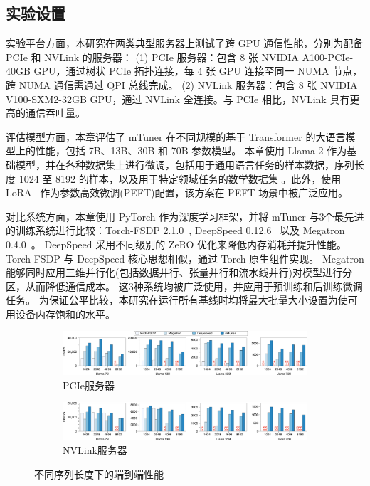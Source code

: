 \subsection{实验设置}
实验平台方面，本研究在两类典型服务器上测试了跨 GPU 通信性能，分别为配备 PCIe 和 NVLink 的服务器：
(1) PCIe 服务器：包含 8 张 NVIDIA A100-PCIe-40GB GPU，通过树状 PCIe 拓扑连接，每 4 张 GPU 连接至同一 NUMA 节点，跨 NUMA 通信需通过 QPI 总线完成。
(2) NVLink 服务器：包含 8 张 NVIDIA V100-SXM2-32GB GPU，通过 NVLink 全连接。与 PCIe 相比，NVLink 具有更高的通信吞吐量。

评估模型方面，本章评估了 mTuner 在不同规模的基于 Transformer 的大语言模型上的性能，包括 7B、13B、30B 和 70B 参数模型。
本章使用 Llama-2 \cite {llama2} 作为基础模型，并在各种数据集上进行微调，包括用于通用语言任务的样本数据，序列长度 1024 至 8192 的样本，以及用于特定领域任务的数学数据集 \cite{math-datatset}。此外，使用 LoRA~\cite {peft-adapter-lora} 作为参数高效微调(PEFT)配置，该方案在 PEFT 场景中被广泛应用\cite {huggingface-peft}。

对比系统方面，本章使用 PyTorch 作为深度学习框架，并将 mTuner 与3个最先进的训练系统进行比较：Torch-FSDP 2.1.0~\cite{TorchFSDP}, DeepSpeed 0.12.6~\cite{rasley2020DeepSpeed} 以及 Megatron 0.4.0~\cite{krothikanti2022megatronv3}。
DeepSpeed 采用不同级别的 ZeRO 优化来降低内存消耗并提升性能。
Torch-FSDP 与 DeepSpeed 核心思想相似，通过 Torch 原生组件实现。
Megatron 能够同时应用三维并行化(包括数据并行、张量并行和流水线并行)对模型进行分区，从而降低通信成本。
这3种系统均被广泛使用，并应用于预训练和后训练微调任务。
为保证公平比较，本研究在运行所有基线时均将最大批量大小设置为使可用设备内存饱和的水平。

\begin{figure}[t]
     \centering
     \begin{subfigure}[b]{\textwidth}
         \centering
         \includegraphics[width=\textwidth]{figures/mtuner/exp-img/overall-a100-crop.pdf}
         \caption{PCIe服务器}
         \label{fig:overall-a100}
     \end{subfigure}
     \vfill
     \begin{subfigure}[b]{\textwidth}
         \centering
         \includegraphics[width=\textwidth]{figures/mtuner/exp-img/overall-all-seq-v100-nvlink-crop.pdf}
         \caption{NVLink服务器}
         \label{fig:overall-v100}
     \end{subfigure}
     \caption{不同序列长度下的端到端性能}
     \label{fig:overall}
\end{figure}


